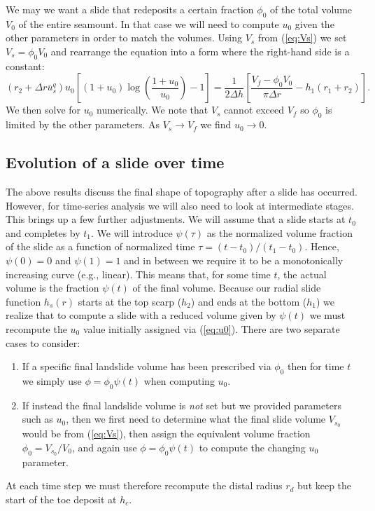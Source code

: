 \documentclass[12pt,letterpaper,margin=0.5in]{report}
\begin{document}
We may we want a slide that redeposits a certain fraction $\phi_0$ of the total volume $V_0$ of the entire seamount. In that
case we will need to compute $u_0$ given the other parameters in order to match the volumes.  Using
$V_s$ from (\ref{eq:Vs}) we set $V_s = \phi_0 V_0$ and rearrange the equation into a form where the right-hand side is a constant:
\begin{equation}
\left ( r_2 + \Delta r \bar{u}_s^q \right ) u_0 \left [ (1 + u_0) \log \left (\frac{1 + u_0}{u_0} \right ) - 1 \right ] = \frac{1}{2\Delta h} \left [\frac{V_f - \phi_0 V_0}{\pi \Delta r} - h_1(r_1 + r_2) \right ].
\label{eq:u0}
\end{equation}
We then solve for $u_0$ numerically.  We note that $V_s$ cannot exceed $V_f$ so $\phi_0$ is limited by the other parameters.  As
$V_s \rightarrow V_f$ we find $u_0 \rightarrow 0$.

\subsection{Evolution of a slide over time}

The above results discuss the final shape of topography after a slide has occurred.  However, for time-series analysis
we will also need to look at intermediate stages.  This brings up a few further adjustments. We will assume that a
slide starts at $t_0$ and completes by $t_1$.  We will introduce $\psi(\tau)$ as the normalized volume fraction of the slide
as a function of normalized time $\tau = (t - t_0)/(t_1 - t_0)$.  Hence, $\psi(0) = 0$ and $\psi(1) = 1$ and
in between we require it to be a monotonically increasing curve (e.g., linear).  This means that, for some time $t$, the actual
volume is the fraction $\psi(t)$ of the final volume. Because our radial slide function $h_s(r)$ starts at the top scarp ($h_2$) and
ends at the bottom ($h_1$) we realize that to compute a slide with a reduced volume given by $\psi(t)$ we must
recompute the $u_0$ value initially assigned via (\ref{eq:u0}). There are two separate cases to consider:
\begin{enumerate}
  \item If a specific final landslide volume has been prescribed via $\phi_0$ then for time $t$ we simply use $\phi = \phi_0 \psi(t)$
  when computing $u_0$.
  \item If instead the final landslide volume is \emph{not} set but we provided parameters such as $u_0$, then we first need to determine
  what the final slide volume $V_{s_0}$ would be from (\ref{eq:Vs}), then assign the equivalent volume fraction  $\phi_0 = V_{s_0}/V_0$, and
  again use $\phi = \phi_0 \psi(t)$ to compute the changing $u_0$ parameter.
\end{enumerate}
At each time step we must therefore recompute the distal radius $r_d$ but keep the start of the toe deposit at $h_c$.
\end{document}
